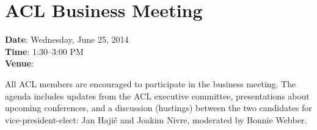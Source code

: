 \section[ACL Business Meeting]{ACL Business Meeting}
\thispagestyle{emptyheader}

\textbf{Date}: Wednesday, June 25, 2014 \\
\textbf{Time}: 1:30--3:00 PM \\
\textbf{Venue}: \BusinessMeetingLoc

All ACL members are encouraged to participate in the business
meeting. The agenda includes updates from the ACL executive committee,
presentations about upcoming conferences, and a discussion
(hustings) between the two candidates for vice-president-elect: Jan
Hajič and Joakim Nivre, moderated by Bonnie Webber.

